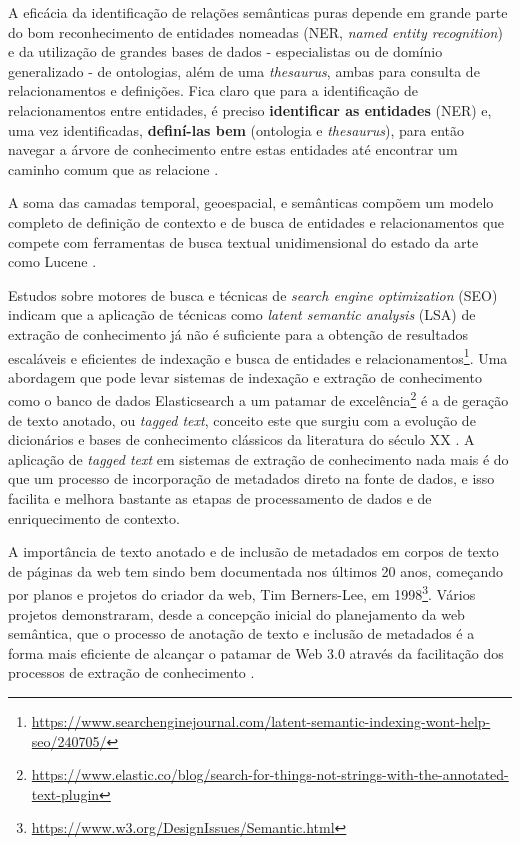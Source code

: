 A eficácia da identificação de relações semânticas puras depende em grande parte do bom reconhecimento de entidades nomeadas (NER, \textit{named entity recognition}) e da utilização de grandes bases de dados - especialistas ou de domínio generalizado - de ontologias, além de uma \textit{thesaurus}, ambas para consulta de relacionamentos e definições. Fica claro que para a identificação de relacionamentos entre entidades, é preciso \textbf{identificar as entidades} (NER) e, uma vez identificadas, \textbf{definí-las bem} (ontologia e \textit{thesaurus}), para então navegar a árvore de conhecimento entre estas entidades até encontrar um caminho comum que as relacione \cite{Amann2000IntegratingOA}.

A soma das camadas temporal, geoespacial, e semânticas compõem um modelo completo de definição de contexto e de busca de entidades e relacionamentos que compete com ferramentas de busca textual unidimensional do estado da arte como Lucene \cite{Li2014TowardsGS}.

Estudos sobre motores de busca e técnicas de \textit{search engine optimization} (SEO) indicam que a aplicação de técnicas como \textit{latent semantic analysis} (LSA) de extração de conhecimento já não é suficiente para a obtenção de resultados escaláveis e eficientes de indexação e busca de entidades e relacionamentos\footnote{\url{https://www.searchenginejournal.com/latent-semantic-indexing-wont-help-seo/240705/}}. Uma abordagem que pode levar sistemas de indexação e extração de conhecimento como o banco de dados Elasticsearch a um patamar de excelência\footnote{\url{https://www.elastic.co/blog/search-for-things-not-strings-with-the-annotated-text-plugin}} é a de geração de texto anotado, ou \textit{tagged text}, conceito este que surgiu com a evolução de dicionários e bases de conhecimento clássicos da literatura do século XX \cite{Tompa1989WhatI}. A aplicação de \textit{tagged text} em sistemas de extração de conhecimento nada mais é do que um processo de incorporação de metadados direto na fonte de dados, e isso facilita e melhora bastante as etapas de processamento de dados e de enriquecimento de contexto.

A importância de texto anotado e de inclusão de metadados em corpos de texto de páginas da web tem sindo bem documentada nos últimos 20 anos, começando por planos e projetos do criador da web, Tim Berners-Lee, em 1998\footnote{\url{https://www.w3.org/DesignIssues/Semantic.html}}. Vários projetos demonstraram, desde a concepção inicial do planejamento da web semântica, que o processo de anotação de texto e inclusão de metadados é a forma mais eficiente de alcançar o patamar de Web 3.0 através da facilitação dos processos de extração de conhecimento \cite{Handschuh2005CreatingOM,Slimani2013SemanticAT}.

